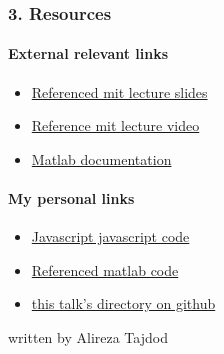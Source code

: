 \documentclass[11pt]{article}
\providecommand{\tightlist}{%
      \setlength{\itemsep}{0pt}\setlength{\parskip}{0pt}}
\begin{document}
    \hypertarget{resources}{%
\subsubsection{3. Resources}\label{resources}}

\hypertarget{external-relevant-links}{%
\paragraph{External relevant links}\label{external-relevant-links}}

\begin{itemize}
\tightlist
\item
  \href{https://ocw.mit.edu/courses/electrical-engineering-and-computer-science/6-0001-introduction-to-computer-science-and-programming-in-python-fall-2016/lecture-slides-code/MIT6_0001F16_Lec8.pdf}{Referenced
  mit lecture slides}
\item
  \href{https://ocw.mit.edu/courses/electrical-engineering-and-computer-science/6-0001-introduction-to-computer-science-and-programming-in-python-fall-2016/lecture-videos/lecture-8-object-oriented-programming/}{Reference
  mit lecture video}
\item
  \href{https://www.mathworks.com/help/matlab/object-oriented-design-with-matlab.html}{Matlab
  documentation}
\end{itemize}

\hypertarget{my-personal-links}{%
\paragraph{My personal links}\label{my-personal-links}}

\begin{itemize}
\tightlist
\item
  \href{https://codepen.io/ATajadod94/pen/pKvOLE?editors=0010}{Javascript
  javascript code}
\item
  \href{https://github.com/ATajadod94/ALITrack/tree/master/src}{Referenced
  matlab code}
\item
  \href{https://github.com/ATajadod94/Python_tutorial/tree/master/Code/Object_oriented}{this
  talk's directory on github}
\end{itemize}

    written by Alireza Tajdod


    
    
    
    
\end{document}
